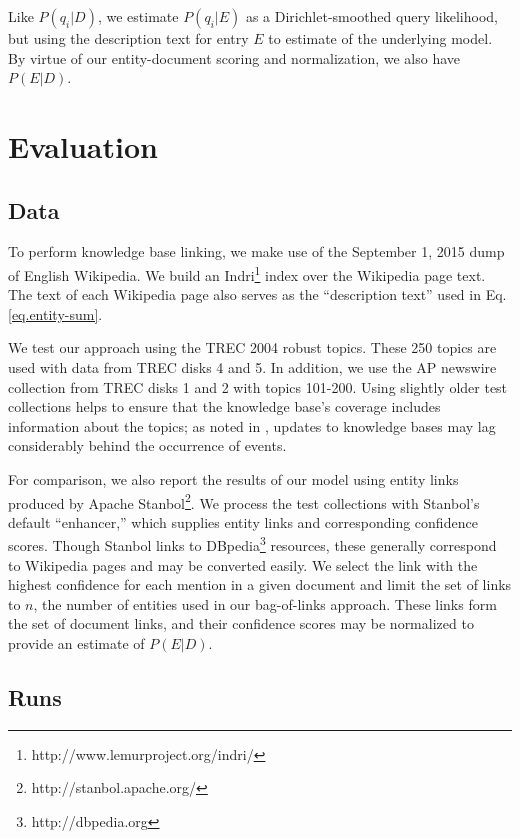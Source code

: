 \documentclass{sig-alternate}
\begin{document}
\noindent Like $P(q_i|D)$, we estimate $P(q_i|E)$ as a Dirichlet-smoothed query likelihood, but using the description text for entry $E$ to estimate of the underlying model. By virtue of our entity-document scoring and normalization, we also have $P(E|D)$.

\section{Evaluation}\label{section.evaluation}

\subsection{Data}\label{section.evaluation.collections}

To perform knowledge base linking, we make use of the September 1, 2015 dump of English Wikipedia. We build an Indri\footnote{http://www.lemurproject.org/indri/} index over the Wikipedia page text. The text of each Wikipedia page also serves as the ``description text'' used in Eq. \ref{eq.entity-sum}.

We test our approach using the TREC 2004 robust topics. These 250 topics are used with data from TREC disks 4 and 5. In addition, we use the AP newswire collection from TREC disks 1 and 2 with topics 101-200. Using slightly older test collections helps to ensure that the knowledge base's coverage includes information about the topics; as noted in \cite{Frank2013}, updates to knowledge bases may lag considerably behind the occurrence of events.

For comparison, we also report the results of our model using entity links produced by Apache Stanbol\footnote{http://stanbol.apache.org/}. We process the test collections with Stanbol's default ``enhancer,'' which supplies entity links and corresponding confidence scores. Though Stanbol links to DBpedia\footnote{http://dbpedia.org} resources, these generally correspond to Wikipedia pages and may be converted easily. We select the link with the highest confidence for each mention in a given document and limit the set of links to $n$, the number of entities used in our bag-of-links approach. These links form the set of document links, and their confidence scores may be normalized to provide an estimate of $P(E|D)$.

\subsection{Runs}\label{section.evaluation.runs}
\end{document}
